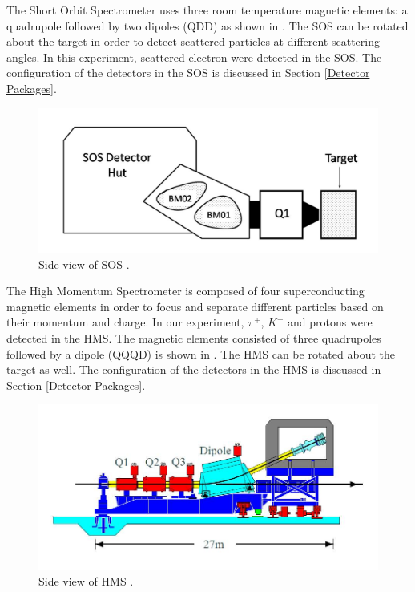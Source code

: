 \setlength{\figwidth}{1.0\linewidth}

%
\label{SOS}
The Short Orbit Spectrometer uses three room temperature magnetic elements: a quadrupole followed by two dipoles (QDD) as shown in  \cite{GaskelD}. The SOS can be rotated about the target in order to detect scattered particles at different scattering angles. In this experiment, scattered electron were detected in the SOS. The configuration of the detectors in the SOS is discussed in Section \ref{Detector Packages}.

\begin{figure}[tbp]
  \centering
  \includegraphics[trim = 0mm 4mm 2mm 0mm,clip,width=0.9\columnwidth]{sos}
  \caption[Side view of SOS \cite{GaskelD}.]{\label{fig:sos}Side view of SOS \cite{GaskelD}.}
\end{figure}

%
\label{HMS}
The High Momentum Spectrometer is composed of four superconducting magnetic elements in order to focus and separate different particles based on their momentum and charge. In our experiment, $\pi^+$, $K^+$ and protons were detected in the HMS. The magnetic elements consisted of three quadrupoles followed by a dipole (QQQD) is shown in  \cite{GaskelD}. The HMS can be rotated about the target as well. The configuration of the detectors in the HMS is discussed in Section \ref{Detector Packages}.

\begin{figure}[tbp]
  \centering
  \includegraphics[trim = 0mm 10mm 2mm 0mm,clip,width=1.0\columnwidth]{hms}
  \caption[Side view of HMS \cite{GaskelD}.]{\label{fig:hms}Side view of HMS \cite{GaskelD}.}
\end{figure}

